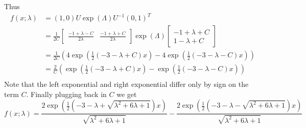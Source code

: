 \documentclass{article}
\theoremstyle{plain}
\theoremstyle{definition}
\theoremstyle{remark}
\numberwithin{equation}{section}
\begin{document}
Thus
\begin{align*}
     f(x; \lambda) &= (1, 0) U \exp(\Lambda) U^{-1} (0,1)^T\\
     &= \frac{1}{2C} \begin{bmatrix}
    \frac{-1 + \lambda - C}{2\lambda} & \frac{-1 + \lambda + C}{2\lambda}
    \end{bmatrix} \exp(\Lambda)  \begin{bmatrix}
    -1 + \lambda + C\\
    1 - \lambda + C
    \end{bmatrix}\\
    &= \frac{1}{2C} \left( 4 \exp\left(\frac{1}{2}(-3 - \lambda + C) x\right) - 4 \exp\left(\frac{1}{2}(-3 - \lambda - C) x\right) \right)\\
    &= \frac{2}{C} \left( \exp\left(\frac{1}{2}(-3 - \lambda + C) x\right) - \exp\left(\frac{1}{2}(-3 - \lambda - C) x\right) \right)\\
\end{align*}
Note that the left exponential and right exponential differ only by sign on the term $C$.
Finally plugging back in $C$ we get
\begin{equation} \label{eq:t_density}
      f(x; \lambda) = \frac{2 \exp\left(\frac{1}{2}(-3 - \lambda + \sqrt{\lambda^2 + 6 \lambda + 1}) x\right)}{\sqrt{\lambda^2 + 6 \lambda + 1}}  - \frac{2 \exp\left(\frac{1}{2}(-3 - \lambda - \sqrt{\lambda^2 + 6 \lambda + 1}) x\right)}{\sqrt{\lambda^2 + 6 \lambda + 1}}
\end{equation}

\end{document}
